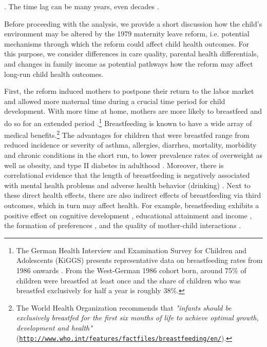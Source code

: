 \documentclass[11pt, a4paper]{article} %
\begin{document}
\citep{almond2011fetalorigins}. The time lag can be many years, even decades \citep{shonkoff2009neuroscience}.\newline


Before proceeding with the analysis, we provide a short discussion how the child's environment may be altered by the 1979 maternity leave reform, i.e. potential mechanisms through which the reform could affect child health outcomes. For this purpose, we consider differences in care quality, parental health differentials, and changes in family income as potential pathways how the reform may affect long-run child health outcomes.  \newline %

First, the reform induced mothers to postpone their return to the labor market and allowed more maternal time during a crucial time period for child development. With more time at home, mothers are more likely to breastfeed and do so for an extended period \citep{baker2008maternal,berger2005earlymaternal}.\footnote{The German Health Interview and Examination Survey for Children and Adolescents (KiGGS) presents representative data on breastfeeding rates from 1986 onwards \citep{lange2007breastfeeding}. From the West-German 1986 cohort born, around 75\% of children were breastfed at least once and the share of children who was breastfed exclusively for half a year is roughly 38\%.} Breastfeeding is known to have a wide array of medical benefits.\footnote{The World Health Organization recommends that \textit{"infants should be exclusively breastfed for the first six months of life to achieve optimal growth, development and health"} (\href{http://www.who.int/features/factfiles/breastfeeding/en/}{\nolinkurl{http://www.who.int/features/factfiles/breastfeeding/en/}}).} The advantages for children that were breastfed range from reduced incidence or severity of asthma, allergies, diarrhea, mortality, morbidity and chronic conditions in the short run, to lower prevalence rates of overweight as well as obesity, and type II diabetes in adulthood \citep{ruhm2000parental, victora2016breastfeeding}. Moreover, there is correlational evidence that the length of breastfeeding is negatively associated with mental health problems and adverse health behavior (drinking) \citep{oddy2010longterm,falk2016early}. Next to these direct health effects, there are also indirect effects of breastfeeding via third outcomes, which in turn may affect health. For example, breastfeeding exhibits a positive effect on cognitive development \citep{albagli2018}, educational attainment and income \citep{victoria2015association}, the formation of preferences \citep{falk2016early}, and the quality of mother-child interactions \citep{papp2014longitudinal}. \newline 
\end{document}
